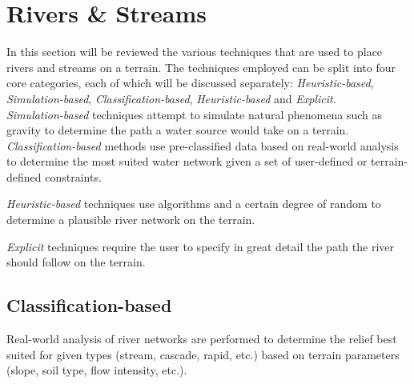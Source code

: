 \section{Rivers \& Streams}

In this section will be reviewed the various techniques that are used to place rivers and streams on a terrain. The techniques employed can be split into four core categories, each of which will be discussed separately: \textit{Heuristic-based}, \textit{Simulation-based}, \textit{Classification-based}, \textit{Heuristic-based} and \textit{Explicit}. \\

\textit{Simulation-based} techniques attempt to simulate natural phenomena such as gravity to determine the path a water source would take on a terrain.\\

\textit{Classification-based} methods use pre-classified data based on real-world analysis to determine the most suited water network given a set of user-defined or terrain-defined constraints.

\textit{Heuristic-based} techniques use algorithms and a certain degree of random to determine a plausible river network on the terrain.

\textit{Explicit} techniques require the user to specify in great detail the path the river should follow on the terrain.

\subsection{Classification-based}

Real-world analysis of river networks are performed to determine the relief best suited for given types (stream, cascade, rapid, etc.) based on terrain parameters (slope, soil type, flow intensity, etc.).

